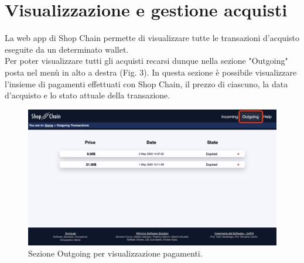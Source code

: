 \documentclass[a4paper, 12pt]{article}
\begin{document}
\section{Visualizzazione e gestione acquisti}
La web app di Shop Chain permette di visualizzare tutte le transazioni d'acquisto eseguite da un determinato wallet.\\
Per poter visualizzare tutti gli acquisti recarsi dunque nella sezione "Outgoing" posta nel menù in alto a destra (Fig. 3). In questa sezione è possibile visualizzare l'insieme di pagamenti effettuati con Shop Chain, il prezzo di ciascuno, la data d'acquisto e lo stato attuale della transazione.\\
\FloatBarrier
\begin{figure}[!h]
\centering
\includegraphics[width=0.9
\linewidth]{img/outgoing.png}
\caption{Sezione Outgoing per visualizzazione pagamenti.}
\end{figure}
\FloatBarrier
\end{document}
